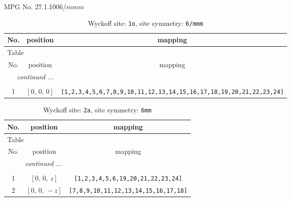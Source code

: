 \documentclass[fleqn,8pt]{jsarticle}
\begin{document}
\setcounter{MaxMatrixCols}{32}

\renewcommand{\tablename}{Table~}
\renewcommand{\figurename}{Figure~}
\begin{center}
\LARGE
MPG No. 27.1.100\quad$6/mmm$
\end{center}
\renewcommand{\arraystretch}{1.2}
\begin{longtable}{ccc}
\caption{Wyckoff site: {\tt 1o}, site symmetry: {\tt 6/mmm}}
 \\
 \hline \hline
No. & position & mapping \\ \hline \endfirsthead

\multicolumn{2}{l}{\tablename\ \thetable{}} \\
 \hline \hline
No. & position & mapping \\ \hline \endhead

 \hline \hline
\multicolumn{2}{r}{\footnotesize\it continued ...} \\ \endfoot

 \hline \hline
\multicolumn{2}{r}{} \\ \endlastfoot

1 & $\left[ 0,\, 0,\, 0 \right]$ & {\tt [1,2,3,4,5,6,7,8,9,10,11,12,13,14,15,16,17,18,19,20,21,22,23,24]} \\
\end{longtable}
\renewcommand{\arraystretch}{1.2}
\begin{longtable}{ccc}
\caption{Wyckoff site: {\tt 2a}, site symmetry: {\tt 6mm}}
 \\
 \hline \hline
No. & position & mapping \\ \hline \endfirsthead

\multicolumn{2}{l}{\tablename\ \thetable{}} \\
 \hline \hline
No. & position & mapping \\ \hline \endhead

 \hline \hline
\multicolumn{2}{r}{\footnotesize\it continued ...} \\ \endfoot

 \hline \hline
\multicolumn{2}{r}{} \\ \endlastfoot

1 & $\left[ 0,\, 0,\, z \right]$ & {\tt [1,2,3,4,5,6,19,20,21,22,23,24]} \\ \hline
2 & $\left[ 0,\, 0,\, - z \right]$ & {\tt [7,8,9,10,11,12,13,14,15,16,17,18]} \\
\end{longtable}
\renewcommand{\arraystretch}{1.2}
\end{document}
